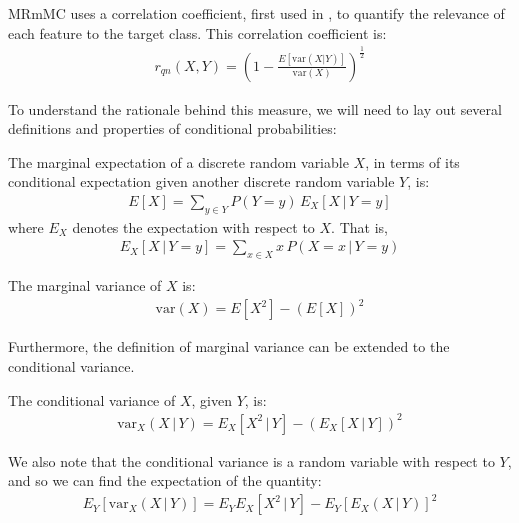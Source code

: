 \documentclass[12pt, twoside, a4paper]{report}
\def\var{\text{var}}
\begin{document}
MRmMC uses a correlation coefficient, first used in \cite{RefWorks:188}, to quantify the relevance of each feature to the target class. This correlation coefficient is:
\begin{align} \label{mrmmc:eq:relevance}
r_{qn}(X, Y) = \left( 1 - \frac{E[\var(X|Y)]}{\var(X)} \right)^{\frac{1}{2}}
\end{align}


To understand the rationale behind this measure, we will need to lay out several definitions and properties of conditional probabilities:\\

\begin{mydef}
\label{mrmmc:def:margex}
The marginal expectation of a discrete random variable $X$, in terms of its conditional expectation given another discrete random variable $Y$, is:
\begin{align*}
E[X] = \sum_{y \in Y} P(Y=y) \, E_X[X \, | \, Y=y]
\end{align*}
where $E_X$ denotes the expectation with respect to $X$. That is,
\begin{align*}
E_X[X \, | \,Y=y] = \sum_{x\in X} x \, P(X=x \, | \, Y=y)
\end{align*}
\end{mydef}

\begin{mydef}
\label{mrmmc:def:margvar}
The marginal variance of $X$ is:
\begin{align*}
\var(X) = E[X^2] - \left( E[X] \right) ^2
\end{align*}
\end{mydef}

Furthermore, the definition of marginal variance can be extended to the conditional variance.\\

\begin{mydef}
The conditional variance of $X$, given $Y$, is:
\begin{align*}
\var_X(X \, | \, Y) = E_X[X^2 \, | \, Y] - \left( E_X[X \, | \, Y] \right)^2
\end{align*}
\end{mydef}

We also note that the conditional variance is a random variable with respect to $Y$, and so we can find the expectation of the quantity:
\begin{align*}
E_Y [ \var_X(X \, | \, Y) ] = E_YE_X[X^2 \, | \, Y] - E_Y [ E_X(X\,|\,Y) ] ^2
\end{align*}
\end{document}
